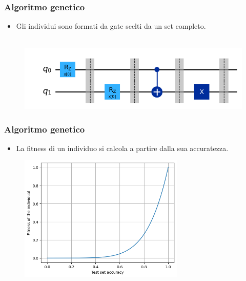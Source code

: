 \documentclass{beamer}
\begin{document}
\begin{frame}
  \frametitle{Algoritmo genetico}
  \begin{itemize}
    \item Gli individui sono formati da gate scelti da un set completo.\\\,
  \end{itemize}
  \begin{figure}
    \includegraphics[width=\textwidth]{images/fenotip.png}
  \end{figure} 
\end{frame}

\begin{frame}
  \frametitle{Algoritmo genetico}
  \begin{itemize}
    \item La fitness di un individuo si calcola a partire dalla sua accuratezza.
  \end{itemize}

  \begin{figure}
    \includegraphics[width=0.7\textwidth]{images/sigmoid.png}
  \end{figure} 
\end{frame}
\end{document}
